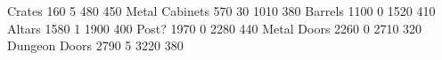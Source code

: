 \documentclass{article}
\begin{document}
  {Crates}   {160 5 480 450}
  {Metal Cabinets} {570 30 1010 380}
  {Barrels}  {1100 0 1520 410}
  {Altars}   {1580 1 1900 400}
  {Post?}    {1970 0 2280 440}
  {Metal Doors}   { 2260 0 2710 320}
  {Dungeon Doors} { 2790 5 3220 380}

\renewcommand\t{\usebox}

\t\poisontrap
\ \t\spiketrap
\ \t\beartrap
\ \t\icyspikes
\ \t\rubble   
\ \t\stalagmites
\ \t\greenone   
\ \t\icepiller  
\ \t\nest       
\ \t\snowrock   
\ \t\goldenorb     
\ \t\debris        
\ \t\ladder        
\ \t\snowdrift     
\ \t\lavapit       
\ \t\pressureplate 
\ \t\cavedoor
\ \t\dungcor 
\ \t\snowcor 
\ \t\snowdoor
\ \t\crate    
\ \t\metalcab 
\ \t\barrels  
\ \t\altar    
\ \t\post     
\ \t\metaldoor
\ \t\dundoor  
\end{document}
